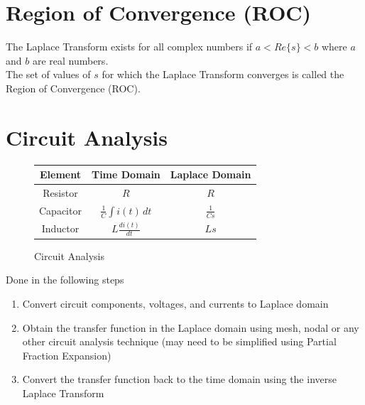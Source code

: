 \documentclass[oneside]{book}
\begin{document}
            \section{Region of Convergence (ROC)}
                The Laplace Transform exists for all complex numbers if $a < Re\{s\} < b$ where $a$ and $b$ are real numbers.\\
                The set of values of $s$ for which the Laplace Transform converges is called the Region of Convergence (ROC).\\
            \section{Circuit Analysis}
                \begin{figure}[H]
                    \centering
                    \begin{tabular}{|c|c|c|}
                        \hline
                        Element & Time Domain & Laplace Domain \\
                        \hline
                        Resistor & $R$ & $R$ \\
                        \hline
                        Capacitor & $\frac{1}{C} \int i(t) \, dt$ & $\frac{1}{Cs}$ \\
                        \hline
                        Inductor & $L \frac{di(t)}{dt}$ & $Ls$ \\
                        \hline
                    \end{tabular}
                    \caption{Circuit Analysis}
                \end{figure}
                Done in the following steps
                \begin{enumerate}
                    \item Convert circuit components, voltages, and currents to Laplace domain
                    \item Obtain the transfer function in the Laplace domain using mesh, nodal or any other circuit analysis technique (may need
                    to be simplified using Partial Fraction Expansion)
                    \item Convert the transfer function back to the time domain using the inverse Laplace Transform
                \end{enumerate}
\end{document}
